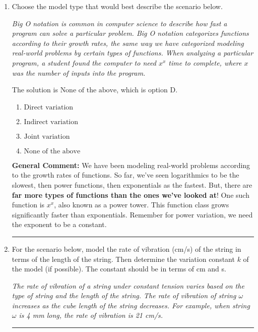 \documentclass{extbook}[14pt]
\newcommand{\litem}[1]{\item #1

\rule{\textwidth}{0.4pt}}
\begin{document}
\begin{enumerate}\litem{
Choose the model type that would best describe the scenario below.

\begin{center}
    \textit{ Big O notation is common in computer science to describe how fast a program can solve a particular problem. Big O notation categorizes functions according to their growth rates, the same way we have categorized modeling real-world problems by certain types of functions. When analyzing a particular program, a student found the computer to need $x^x$ time to complete, where $x$ was the number of inputs into the program. }
\end{center}


The solution is \( \text{None of the above} \), which is option D.\begin{enumerate}[label=\Alph*.]
\item \( \text{Direct variation} \)


\item \( \text{Indirect variation} \)


\item \( \text{Joint variation} \)


\item \( \text{None of the above} \)


\end{enumerate}

\textbf{General Comment:} We have been modeling real-world problems according to the growth rates of functions. So far, we've seen logarithmics to be the slowest, then power functions, then exponentials as the fastest. But, there are \textbf{far more types of functions than the ones we've looked at}! One such function is $x^x$, also known as a power tower. This function class grows significantly faster than exponentials. Remember for power variation, we need the exponent to be a constant.
}
\litem{
For the scenario below, model the rate of vibration (cm/s) of the string in terms of the length of the string. Then determine the variation constant $k$ of the model (if possible). The constant should be in terms of cm and s.

\begin{center}
    \textit{ The rate of vibration of a string under constant tension varies based on the type of string and the length of the string. The rate of vibration of string $\omega$ increases as the cube length of the string decreases. For example, when string $\omega$ is 4 mm long, the rate of vibration is 21 cm/s. }
\end{center}


}
\end{enumerate}
\end{document}

